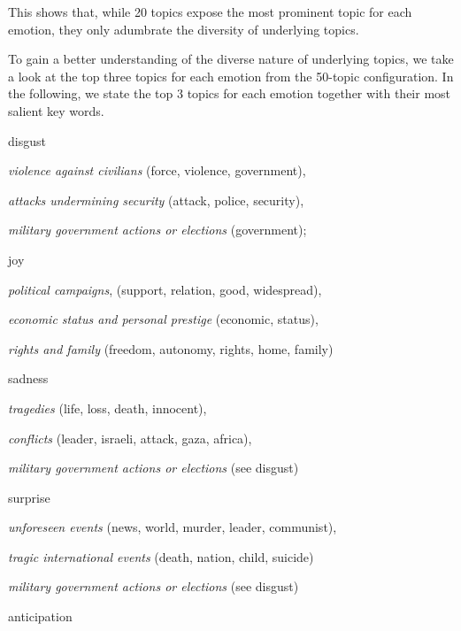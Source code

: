 This shows that, while 20 topics expose the most prominent topic for each emotion, they only adumbrate the diversity of underlying topics.

To gain a better understanding of the diverse nature of underlying topics, we take a look at the top three topics for each emotion from the 50-topic configuration. In the following, we state the top 3 topics for each emotion together with their most salient key words.
\begin{aenumerate}
	\item disgust
	\begin{aenumerate}
		\item \textit{violence against civilians} (force, violence, government),
		\item \textit{attacks undermining security} (attack, police, security),
		\item \textit{military government actions or elections} (government);
	\end{aenumerate}
	\item joy
	\begin{aenumerate}
		\item \textit{political campaigns}, (support, relation, good, widespread),
		\item \textit{economic status and personal prestige} (economic, status),
		\item \textit{rights and family} (freedom, autonomy, rights, home, family)
	\end{aenumerate}
	\item sadness
	\begin{aenumerate}
		\item \textit{tragedies} (life, loss, death, innocent),
		\item \textit{conflicts} (leader, israeli, attack, gaza, africa),
		\item \textit{military government actions or elections} (see disgust)
	\end{aenumerate}
	\item surprise
	\begin{aenumerate}
		\item \textit{unforeseen events} (news, world, murder, leader, communist),
		\item \textit{tragic international events} (death, nation, child, suicide)
		\item \textit{military government actions or elections} (see disgust)
	\end{aenumerate}
	\item anticipation

\end{aenumerate}
